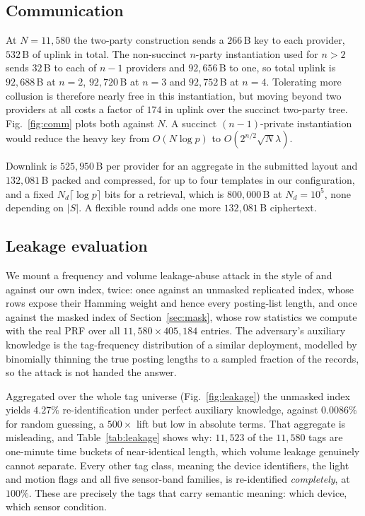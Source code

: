 \documentclass[a4paper,fleqn]{cas-dc}
\begin{document}
\subsection{Communication}
\label{sec:commresult}
At $N=11{,}580$ the two-party construction sends a $266$\,B key to each
provider, $532$\,B of uplink in total. The non-succinct $n$-party
instantiation used for $n>2$ sends $32$\,B to each of $n-1$ providers and
$92{,}656$\,B to one, so total uplink is $92{,}688$\,B at $n=2$,
$92{,}720$\,B at $n=3$ and $92{,}752$\,B at $n=4$. Tolerating more collusion
is therefore nearly free in this instantiation, but moving beyond two
providers at all costs a factor of $174$ in uplink over the succinct two-party
tree. Fig.~\ref{fig:comm} plots both against $N$. A succinct
$(n{-}1)$-private instantiation would reduce the heavy key from $O(N\log p)$
to $O(2^{n/2}\sqrt{N}\lambda)$.

Downlink is $525{,}950$\,B per provider for an aggregate in the submitted
layout and $132{,}081$\,B packed and compressed, for up to four templates in
our configuration, and a fixed $N_d\lceil\log p\rceil$ bits for a retrieval,
which is $800{,}000$\,B at $N_d=10^5$, none depending on $|S|$. A flexible
round adds one more $132{,}081$\,B ciphertext.

\subsection{Leakage evaluation}
\label{sec:leakeval}
We mount a frequency and volume leakage-abuse attack in the style of
\citet{islam2012access} and \citet{cash2015leakage} against our own index,
twice: once against an unmasked replicated index, whose rows expose their
Hamming weight and hence every posting-list length, and once against the
masked index of Section~\ref{sec:mask}, whose row statistics we compute with
the real PRF over all $11{,}580\times405{,}184$ entries. The adversary's
auxiliary knowledge is the tag-frequency distribution of a similar deployment,
modelled by binomially thinning the true posting lengths to a sampled fraction
of the records, so the attack is not handed the answer.

Aggregated over the whole tag universe (Fig.~\ref{fig:leakage}) the unmasked
index yields $4.27\%$ re-identification under perfect auxiliary knowledge,
against $0.0086\%$ for random guessing, a $500\times$ lift but low in absolute
terms. That aggregate is misleading, and Table~\ref{tab:leakage} shows why:
$11{,}523$ of the $11{,}580$ tags are one-minute time buckets of near-identical
length, which volume leakage genuinely cannot separate. Every other tag class,
meaning the device identifiers, the light and motion flags and all five
sensor-band families, is re-identified \emph{completely}, at $100\%$. These
are precisely the tags that carry semantic meaning: which device, which sensor
condition.
\end{document}
